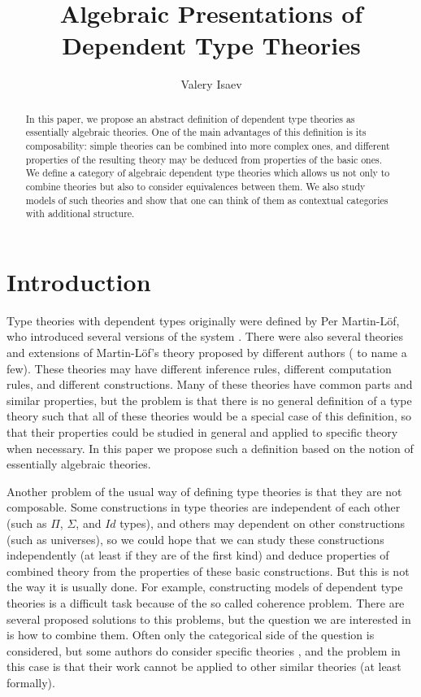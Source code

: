\documentclass[reqno]{amsart}
\theoremstyle{definition}
\theoremstyle{remark}
\numberwithin{figure}{section}
\begin{document}
\title{Algebraic Presentations of Dependent Type Theories}

\author{Valery Isaev}

\begin{abstract}
In this paper, we propose an abstract definition of dependent type theories as essentially algebraic theories.
One of the main advantages of this definition is its composability: simple theories can be combined into more complex ones,
and different properties of the resulting theory may be deduced from properties of the basic ones.
We define a category of algebraic dependent type theories which allows us not only to combine theories but also to consider equivalences between them.
We also study models of such theories and show that one can think of them as contextual categories with additional structure.
\end{abstract}

\maketitle

 \makeatletter
    \providecommand\@dotsep{5}
  \makeatother

\section{Introduction}

Type theories with dependent types originally were defined by Per Martin-L\"{o}f, who introduced several versions of the system \cite{MLTT72,MLTT73,MLTT79}.
There were also several theories and extensions of Martin-L\"{o}f's theory proposed by different authors (\cite{CoC,luo94} to name a few).
These theories may have different inference rules, different computation rules, and different constructions.
Many of these theories have common parts and similar properties,
but the problem is that there is no general definition of a type theory such that all of these theories would be a special case of this definition,
so that their properties could be studied in general and applied to specific theory when necessary.
In this paper we propose such a definition based on the notion of essentially algebraic theories.

Another problem of the usual way of defining type theories is that they are not composable.
Some constructions in type theories are independent of each other (such as $\Pi$, $\Sigma$, and $Id$ types),
and others may dependent on other constructions (such as universes),
so we could hope that we can study these constructions independently (at least if they are of the first kind)
and deduce properties of combined theory from the properties of these basic constructions.
But this is not the way it is usually done.
For example, constructing models of dependent type theories is a difficult task because of the so called coherence problem.
There are several proposed solutions to this problems, but the question we are interested in is how to combine them.
Often only the categorical side of the question is considered,
but some authors do consider specific theories \cite{streicher,pitts},
and the problem in this case is that their work cannot be applied to other similar theories (at least formally).
\end{document}
